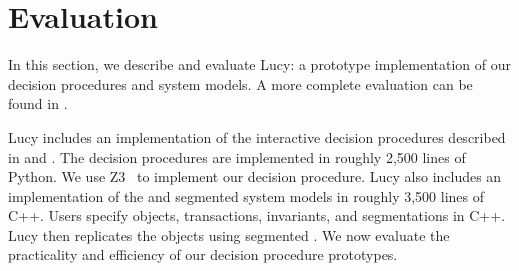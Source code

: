 \section{Evaluation}
In this section, we describe and evaluate Lucy: a prototype implementation of
our decision procedures and system models. A more complete evaluation can be
found in \cite{whittaker2018interactive}.

Lucy includes an implementation of the interactive decision procedures
described in  and
. The decision procedures
are implemented in roughly 2,500 lines of Python.
%
%
We use Z3~\cite{de2008z3} to implement our \invariantclosure{} decision procedure.
%
Lucy also includes an implementation of the \invariantconfluence{} and
segmented \invariantconfluence{} system models in roughly 3,500 lines of C++.
Users specify objects, transactions, invariants, and segmentations in C++. Lucy
then replicates the objects using segmented \invariantconfluence{}.
We now evaluate the practicality and efficiency of our decision procedure
prototypes.

